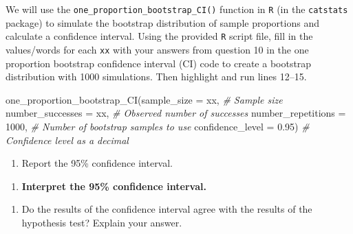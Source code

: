 \documentclass[
]{report}
\newenvironment{Shaded}{\begin{snugshade}}{\end{snugshade}}
\newcommand{\AttributeTok}[1]{\textcolor[rgb]{0.77,0.63,0.00}{#1}}
\newcommand{\CommentTok}[1]{\textcolor[rgb]{0.56,0.35,0.01}{\textit{#1}}}
\newcommand{\DecValTok}[1]{\textcolor[rgb]{0.00,0.00,0.81}{#1}}
\newcommand{\FloatTok}[1]{\textcolor[rgb]{0.00,0.00,0.81}{#1}}
\newcommand{\FunctionTok}[1]{\textcolor[rgb]{0.00,0.00,0.00}{#1}}
\newcommand{\NormalTok}[1]{#1}
\providecommand{\tightlist}{%
  \setlength{\itemsep}{0pt}\setlength{\parskip}{0pt}}
\begin{document}
We will use the \texttt{one\_proportion\_bootstrap\_CI()} function in \texttt{R} (in the \texttt{catstats} package) to simulate the bootstrap distribution of sample proportions and calculate a confidence interval. Using the provided \texttt{R} script file, fill in the values/words for each \texttt{xx} with your answers from question 10 in the one proportion bootstrap confidence interval (CI) code to create a bootstrap distribution with 1000 simulations. Then highlight and run lines 12--15.

\begin{Shaded}
\begin{Highlighting}[]
\FunctionTok{one\_proportion\_bootstrap\_CI}\NormalTok{(}\AttributeTok{sample\_size =}\NormalTok{ xx, }\CommentTok{\# Sample size}
                    \AttributeTok{number\_successes =}\NormalTok{ xx, }\CommentTok{\# Observed number of successes}
                    \AttributeTok{number\_repetitions =} \DecValTok{1000}\NormalTok{, }\CommentTok{\# Number of bootstrap samples to use}
                    \AttributeTok{confidence\_level =} \FloatTok{0.95}\NormalTok{) }\CommentTok{\# Confidence level as a decimal}
\end{Highlighting}
\end{Shaded}

\begin{enumerate}
\def\labelenumi{\arabic{enumi}.}
\setcounter{enumi}{10}
\tightlist
\item
  Report the 95\% confidence interval.
\end{enumerate}

\vspace{0.5in}

\begin{enumerate}
\def\labelenumi{\arabic{enumi}.}
\setcounter{enumi}{11}
\tightlist
\item
  \textbf{Interpret the 95\% confidence interval.}
\end{enumerate}

\vspace{0.8in}

\begin{enumerate}
\def\labelenumi{\arabic{enumi}.}
\setcounter{enumi}{12}
\tightlist
\item
  Do the results of the confidence interval agree with the results of the hypothesis test? Explain your answer.
\end{enumerate}

\vspace{0.8in}
\end{document}
